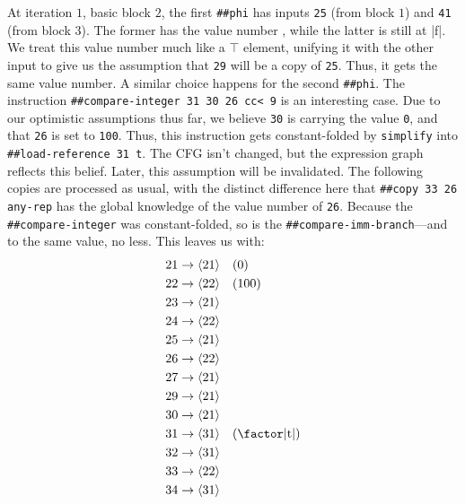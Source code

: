 At iteration $1$, basic block $2$, the first \Verb|##phi| has inputs
\Verb|25| (from block $1$) and \Verb|41| (from block $3$).  The former has
the value number , while the latter is still at \factor|f|.  We treat
this value number much like a $\top$ element, unifying it with the other input
to give us the assumption that \Verb|29| will be a copy of \Verb|25|.
Thus, it gets the same value number.  A similar choice happens for the second
\Verb|##phi|.  The instruction 
%
\Verb|##compare-integer 31 30 26 cc< 9|
%
is an interesting case.  Due to our optimistic assumptions thus far, we believe
\Verb|30| is carrying the value \Verb|0|, and that \Verb|26| is set to
\Verb|100|.  Thus, this instruction gets constant-folded by \Verb|simplify|
into
%
\Verb|##load-reference 31 t|.
%
The \gls{CFG} isn't changed, but the expression graph reflects this belief.
Later, this assumption will be invalidated.  The following copies are processed
as usual, with the distinct difference here that 
%
\Verb|##copy 33 26 any-rep|
%
has the global knowledge of the value number of \Verb|26|.  Because the
\Verb|##compare-integer| was constant-folded, so is the
\Verb|##compare-imm-branch|---and to the same value, no less.  This leaves us
with:
%
\begin{align*}
  21 &\to \vn{21} \quad (0)                 \\
  22 &\to \vn{22} \quad (100)               \\
  23 &\to \vn{21}                           \\
  24 &\to \vn{22}                           \\
  25 &\to \vn{21}                           \\
  26 &\to \vn{22}                           \\
  27 &\to \vn{21}                           \\
  29 &\to \vn{21}                           \\
  30 &\to \vn{21}                           \\
  31 &\to \vn{31} \quad (\text{\factor|t|}) \\
  32 &\to \vn{31}                           \\
  33 &\to \vn{22}                           \\
  34 &\to \vn{31}
\end{align*}

